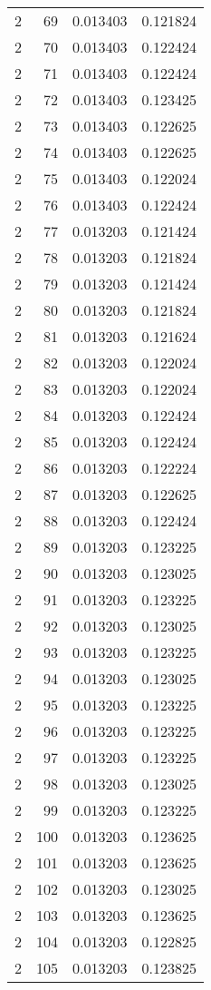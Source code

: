 \begin{longtable}{rrrr}
2 & 69 & 0.013403 & 0.121824 \\
2 & 70 & 0.013403 & 0.122424 \\
2 & 71 & 0.013403 & 0.122424 \\
2 & 72 & 0.013403 & 0.123425 \\
2 & 73 & 0.013403 & 0.122625 \\
2 & 74 & 0.013403 & 0.122625 \\
2 & 75 & 0.013403 & 0.122024 \\
2 & 76 & 0.013403 & 0.122424 \\
2 & 77 & 0.013203 & 0.121424 \\
2 & 78 & 0.013203 & 0.121824 \\
2 & 79 & 0.013203 & 0.121424 \\
2 & 80 & 0.013203 & 0.121824 \\
2 & 81 & 0.013203 & 0.121624 \\
2 & 82 & 0.013203 & 0.122024 \\
2 & 83 & 0.013203 & 0.122024 \\
2 & 84 & 0.013203 & 0.122424 \\
2 & 85 & 0.013203 & 0.122424 \\
2 & 86 & 0.013203 & 0.122224 \\
2 & 87 & 0.013203 & 0.122625 \\
2 & 88 & 0.013203 & 0.122424 \\
2 & 89 & 0.013203 & 0.123225 \\
2 & 90 & 0.013203 & 0.123025 \\
2 & 91 & 0.013203 & 0.123225 \\
2 & 92 & 0.013203 & 0.123025 \\
2 & 93 & 0.013203 & 0.123225 \\
2 & 94 & 0.013203 & 0.123025 \\
2 & 95 & 0.013203 & 0.123225 \\
2 & 96 & 0.013203 & 0.123225 \\
2 & 97 & 0.013203 & 0.123225 \\
2 & 98 & 0.013203 & 0.123025 \\
2 & 99 & 0.013203 & 0.123225 \\
2 & 100 & 0.013203 & 0.123625 \\
2 & 101 & 0.013203 & 0.123625 \\
2 & 102 & 0.013203 & 0.123025 \\
2 & 103 & 0.013203 & 0.123625 \\
2 & 104 & 0.013203 & 0.122825 \\
2 & 105 & 0.013203 & 0.123825 \\

\end{longtable}
